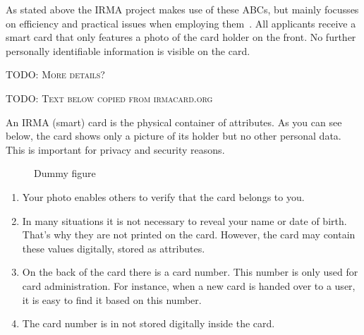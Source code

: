 As stated above the IRMA project makes use of these ABCs, but mainly focusses on efficiency and practical issues when employing them~\cite{abcofabc}. All applicants receive a smart card that only features a photo of the card holder on the front. No further personally identifiable information is visible on the card.

\textsc{TODO: More details?}

\textsc{TODO: Text below copied from irmacard.org}

An IRMA (smart) card is the physical container of attributes. As you can see below, the card shows only a picture of its holder but no other personal data. This is important for privacy and security reasons.

\begin{figure}[!ht]
  \centering
  \caption{Dummy figure}
  \label{fig:dummy}
\end{figure}

\begin{enumerate}
	\item Your photo enables others to verify that the card belongs to you.
  \item In many situations it is not necessary to reveal your name or date of birth. That’s why they are not printed on the card. However, the card may contain these values digitally, stored as attributes.
  \item On the back of the card there is a card number. This number is only used for card administration. For instance, when a new card is handed over to a user, it is easy to find it based on this number.
  \item The card number is in not stored digitally inside the card.
\end{enumerate}

